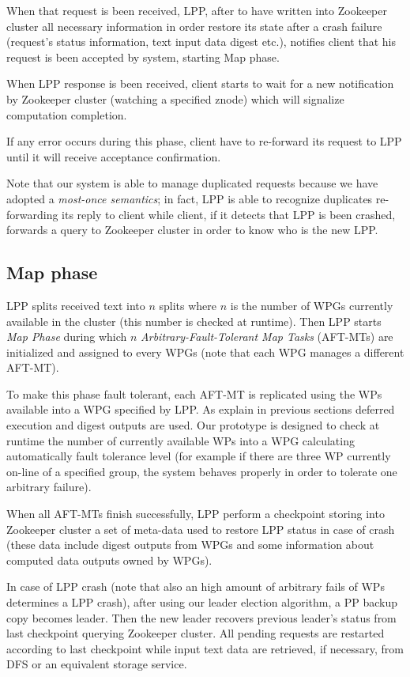 \documentclass[sigchi]{acmart}
\begin{document}
When that request is been received, LPP, after to have written into Zookeeper cluster all necessary information  in order restore its state after a crash failure (request's status information, text input data digest etc.),  notifies client that his request is been accepted by system, starting Map phase.

When LPP response is been received, client starts to wait for a new notification by Zookeeper cluster (watching a specified znode) which will signalize computation completion.

If any error occurs during this phase, client have to re-forward its request to LPP until it will receive acceptance confirmation. 

Note that our system is able to manage duplicated requests because we have adopted a \textit{most-once semantics}; in fact, LPP is able to recognize duplicates re-forwarding its reply to client while client, if it detects that LPP is been crashed, forwards a query to Zookeeper cluster in order to know who is the new LPP.

\subsection{Map phase}

LPP splits received text into $n$ splits where $n$ is the number of WPGs currently available in the cluster (this number is checked at runtime). Then LPP starts \textit{Map Phase} during which $n$ \textit{Arbitrary-Fault-Tolerant Map Tasks} (AFT-MTs) are initialized and assigned to every WPGs (note that each WPG manages a different AFT-MT). 

To make this phase fault tolerant, each AFT-MT is replicated using the WPs available into a WPG specified by LPP. As explain in previous sections deferred execution and digest outputs are used. Our prototype is designed to check at runtime the number of currently available WPs into a WPG calculating automatically fault tolerance level (for example if there are three WP currently on-line of a specified group, the system behaves properly in order to tolerate one arbitrary failure).

When all AFT-MTs finish successfully, LPP perform a checkpoint storing into Zookeeper cluster a set of meta-data used to restore LPP status in case of crash (these data include digest outputs from WPGs and some information about computed data outputs owned by WPGs). 

In case of LPP crash (note that also an high amount of arbitrary fails of WPs determines a LPP crash), after using our leader election algorithm, a PP backup copy becomes leader. Then the new leader recovers previous leader's status from last checkpoint querying Zookeeper cluster. All pending requests are restarted according to last checkpoint while input text data are retrieved, if necessary, from DFS or an equivalent storage service. 
\end{document}
